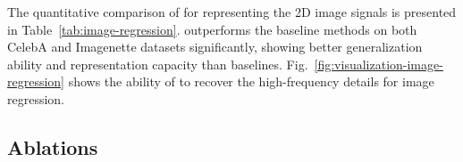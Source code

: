  The quantitative comparison of \method{} for representing the 2D image signals is presented in Table~\ref{tab:image-regression}. \method{} outperforms the baseline methods on both CelebA and Imagenette datasets significantly, showing better generalization ability and representation capacity than baselines. 
Fig.~\ref{fig:visualization-image-regression} shows the ability of \method{} to recover the high-frequency details for image regression.











\subsection{Ablations}
\label{sec:abl-study}


